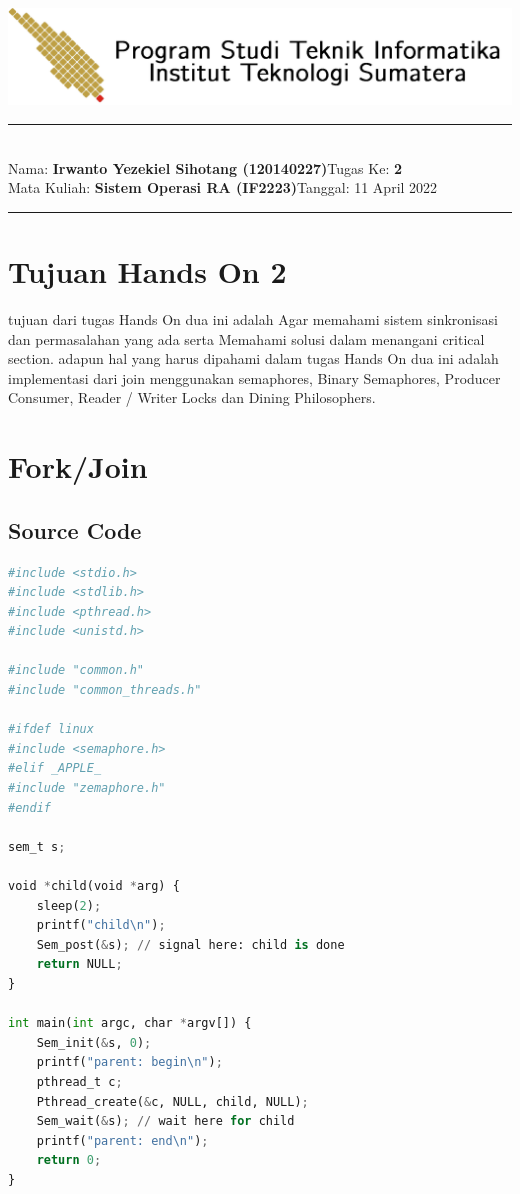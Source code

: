 \documentclass[11pt,a4paper]{article}
\newcommand{\student}{\textbf{Irwanto Yezekiel Sihotang (120140227)}}
\newcommand{\course}{\textbf{Sistem Operasi RA (IF2223)}}
\newcommand{\assignment}{\textbf{2}}
\begin{document}
\thispagestyle{empty}
\begin{center}
	\includegraphics[scale = 0.15]{Figure/ifitera-header.png}
	\vspace{0.1cm}
\end{center}
\noindent
\rule{17cm}{0.2cm}\\[0.3cm]
Nama: \student \hfill Tugas Ke: \assignment\\[0.1cm]
Mata Kuliah: \course \hfill Tanggal: 11 April 2022\\
\rule{17cm}{0.05cm}
\vspace{0.1cm}



\section{Tujuan Hands On 2}
    tujuan dari tugas Hands On dua ini adalah Agar memahami sistem sinkronisasi dan permasalahan yang ada serta Memahami solusi dalam menangani critical section. adapun hal yang harus dipahami dalam tugas Hands On dua ini adalah implementasi dari join menggunakan semaphores, Binary Semaphores, Producer Consumer, Reader / Writer Locks dan Dining Philosophers. 

\section{Fork/Join}

\subsection{Source Code}
\begin{lstlisting}[language=Python, code fork join,label={labelkode}]
#include <stdio.h>
#include <stdlib.h>
#include <pthread.h>
#include <unistd.h>

#include "common.h"
#include "common_threads.h"

#ifdef linux
#include <semaphore.h>
#elif _APPLE_
#include "zemaphore.h"
#endif

sem_t s;

void *child(void *arg) {
    sleep(2);
    printf("child\n");
    Sem_post(&s); // signal here: child is done
    return NULL;
}

int main(int argc, char *argv[]) {
    Sem_init(&s, 0); 
    printf("parent: begin\n");
    pthread_t c;
    Pthread_create(&c, NULL, child, NULL);
    Sem_wait(&s); // wait here for child
    printf("parent: end\n");
    return 0;
}
    \end{lstlisting}
    
\end{document}

